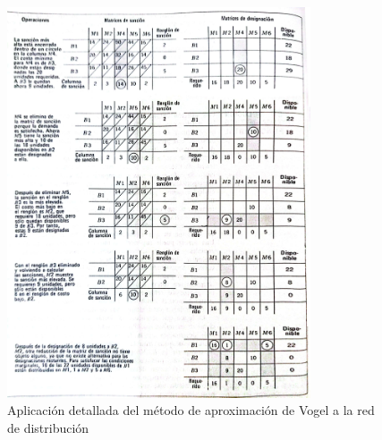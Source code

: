 \documentclass[11pt, a4paper]{article}
\begin{document}
\begin{figure}[H]
\centering
\includegraphics[width=0.8\textwidth]{image4.jpg}
\caption{Aplicación detallada del método de aproximación de Vogel a la red de distribución}
\label{fig:vogel_aplicacion}
\end{figure}
\end{document}
